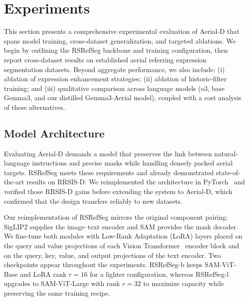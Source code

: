 
\section{Experiments}
\label{sec:experiments}

This section presents a comprehensive experimental evaluation of Aerial-D that spans model training, cross-dataset generalization, and targeted ablations. We begin by outlining the RSRefSeg backbone and training configuration, then report cross-dataset results on established aerial referring expression segmentation datasets. Beyond aggregate performance, we also include: (i) ablation of expression enhancement strategies; (ii) ablation of historic-filter training; and (iii) qualitative comparison across language models (o3, base Gemma3, and our distilled Gemma3-Aerial model), coupled with a cost analysis of these alternatives.

\subsection{Model Architecture}
\label{subsec:model_architecture}

Evaluating Aerial-D demands a model that preserves the link between natural-language instructions and precise masks while handling densely packed aerial targets. RSRefSeg meets these requirements and already demonstrated state-of-the-art results on RRSIS-D\cite{liu2024rotated}. We reimplemented the architecture in PyTorch~\cite{pytorch} and verified those RRSIS-D gains before extending the system to Aerial-D, which confirmed that the design transfers reliably to new datasets.

Our reimplementation of RSRefSeg\cite{chen2025rsrefseg} mirrors the original component pairing: SigLIP2\cite{siglip2} supplies the image–text encoder and SAM\cite{sam} provides the mask decoder. We fine-tune both modules with Low-Rank Adaptation (LoRA)\cite{lora} layers placed on the query and value projections of each Vision Transformer~\cite{vit} encoder block and on the query, key, value, and output projections of the text encoder. Two checkpoints appear throughout the experiments. RSRefSeg-b keeps SAM-ViT-Base and LoRA rank $r=16$ for a lighter configuration, whereas RSRefSeg-l upgrades to SAM-ViT-Large with rank $r=32$ to maximize capacity while preserving the same training recipe.

